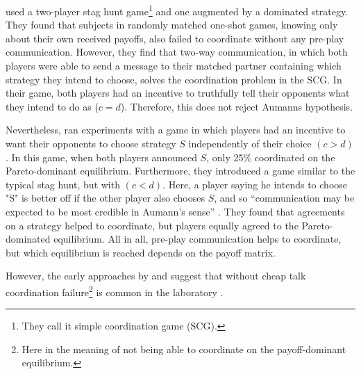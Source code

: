 \textcite{cooper_communication_1992} used a
two-player stag hunt game\footnote{They call 
it simple coordination game (SCG).}  
and one augmented by a dominated strategy. They found that 
subjects in randomly matched one-shot games, knowing only about their own
received payoffs, also failed to coordinate without any pre-play communication. 
However, they find that two-way communication, in which both players were
able to send a message to their matched partner containing which strategy
they intend to choose, solves the coordination problem in the SCG. 
In their game, both players had an incentive to truthfully tell their
opponents what they intend to do as ($c=d$). 
Therefore, this does not reject Aumanns hypothesis.

Nevertheless, \textcite{clark_when_2001} ran experiments with a game in which
players had an incentive to want their opponents to choose strategy $S$ 
independently of their choice $(c > d)$.
In this game, when both players announced $S$, only 25\% coordinated on
the Pareto-dominant equilibrium. Furthermore, they introduced a game
similar to the typical stag hunt, but with $(c<d)$. Here, a player saying he 
intends to choose "S" is better off if the other player also chooses $S$, and
so ``communication may be expected to be most credible in Aumann's sense'' 
\parencite[508]{clark_when_2001}. They found that agreements on a strategy
helped to coordinate, but players equally agreed to the Pareto-dominated
equilibrium. 
All in all, pre-play communication helps to coordinate, but which
equilibrium is reached depends on the payoff matrix.

However, the 
early approaches by \textcite{cooper_communication_1992} and
\textcite{van_huyck_tacit_1990} suggest that without cheap talk 
coordination failure\footnote{Here in the meaning of not being able to coordinate on the payoff-dominant equilibrium.} 
is common in the laboratory \parencite[2]{devetag_when_2007}. 

